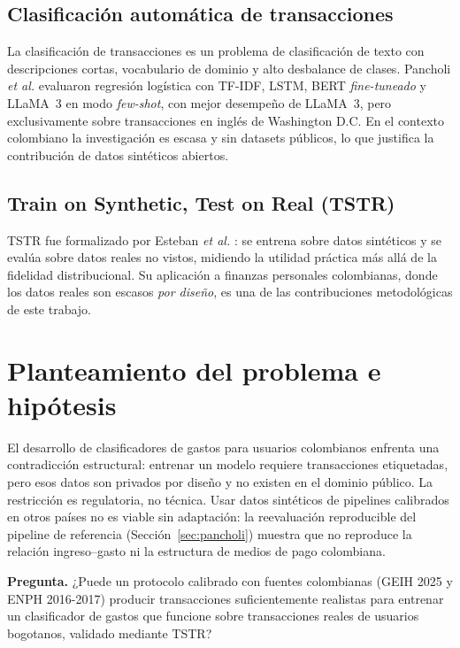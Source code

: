 \documentclass[journal]{IEEEtai}
\begin{document}
\subsection{Clasificación automática de transacciones}
La clasificación de transacciones es un problema de clasificación de texto con descripciones cortas, vocabulario de dominio y alto desbalance de clases. Pancholi \textit{et al.} \cite{pancholi2026} evaluaron regresión logística con TF-IDF, LSTM, BERT \textit{fine-tuneado} y LLaMA~3 en modo \textit{few-shot}, con mejor desempeño de LLaMA~3, pero exclusivamente sobre transacciones en inglés de Washington D.C. En el contexto colombiano la investigación es escasa y sin datasets públicos, lo que justifica la contribución de datos sintéticos abiertos.

\subsection{Train on Synthetic, Test on Real (TSTR)}
TSTR fue formalizado por Esteban \textit{et al.} \cite{esteban2017}: se entrena sobre datos sintéticos y se evalúa sobre datos reales no vistos, midiendo la utilidad práctica más allá de la fidelidad distribucional. Su aplicación a finanzas personales colombianas, donde los datos reales son escasos \emph{por diseño}, es una de las contribuciones metodológicas de este trabajo.

\section{Planteamiento del problema e hipótesis}
El desarrollo de clasificadores de gastos para usuarios colombianos enfrenta una contradicción estructural: entrenar un modelo requiere transacciones etiquetadas, pero esos datos son privados por diseño y no existen en el dominio público. La restricción es regulatoria, no técnica. Usar datos sintéticos de pipelines calibrados en otros países no es viable sin adaptación: la reevaluación reproducible del pipeline de referencia (Sección~\ref{sec:pancholi}) muestra que no reproduce la relación ingreso--gasto ni la estructura de medios de pago colombiana.

\textbf{Pregunta.} ¿Puede un protocolo calibrado con fuentes colombianas (GEIH 2025 y ENPH 2016-2017) producir transacciones suficientemente realistas para entrenar un clasificador de gastos que funcione sobre transacciones reales de usuarios bogotanos, validado mediante TSTR?
\end{document}
